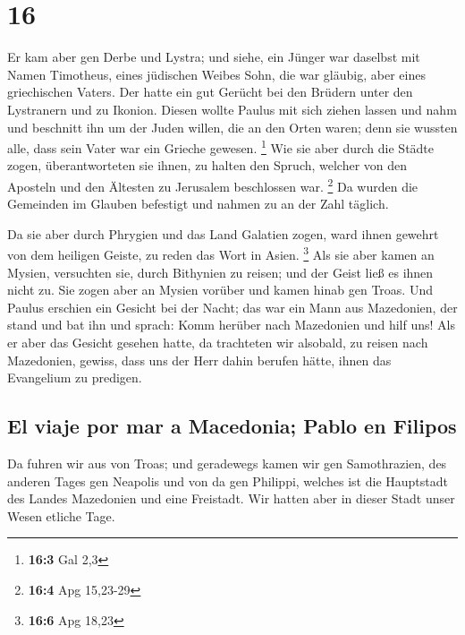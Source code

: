 \hypertarget{section-15}{%
\section{16}\label{section-15}}

 Er kam aber gen Derbe und Lystra; und siehe, ein Jünger
war daselbst mit Namen Timotheus, eines jüdischen Weibes Sohn, die war
gläubig, aber eines griechischen Vaters.  Der hatte ein
gut Gerücht bei den Brüdern unter den Lystranern und zu Ikonion.
 Diesen wollte Paulus mit sich ziehen lassen und nahm und
beschnitt ihn um der Juden willen, die an den Orten waren; denn sie
wussten alle, dass sein Vater war ein Grieche gewesen. \footnote{\textbf{16:3}
  Gal 2,3}  Wie sie aber durch die Städte zogen,
überantworteten sie ihnen, zu halten den Spruch, welcher von den
Aposteln und den Ältesten zu Jerusalem beschlossen war. \footnote{\textbf{16:4}
  Apg 15,23-29}  Da wurden die Gemeinden im Glauben
befestigt und nahmen zu an der Zahl täglich.

 Da sie aber durch Phrygien und das Land Galatien zogen,
ward ihnen gewehrt von dem heiligen Geiste, zu reden das Wort in Asien.
\footnote{\textbf{16:6} Apg 18,23}  Als sie aber kamen an
Mysien, versuchten sie, durch Bithynien zu reisen; und der Geist ließ es
ihnen nicht zu.  Sie zogen aber an Mysien vorüber und
kamen hinab gen Troas.  Und Paulus erschien ein Gesicht
bei der Nacht; das war ein Mann aus Mazedonien, der stand und bat ihn
und sprach: Komm herüber nach Mazedonien und hilf uns! 
Als er aber das Gesicht gesehen hatte, da trachteten wir alsobald, zu
reisen nach Mazedonien, gewiss, dass uns der Herr dahin berufen hätte,
ihnen das Evangelium zu predigen.

\hypertarget{el-viaje-por-mar-a-macedonia-pablo-en-filipos}{%
\subsection{El viaje por mar a Macedonia; Pablo en
Filipos}\label{el-viaje-por-mar-a-macedonia-pablo-en-filipos}}

 Da fuhren wir aus von Troas; und geradewegs kamen wir
gen Samothrazien, des anderen Tages gen Neapolis  und von
da gen Philippi, welches ist die Hauptstadt des Landes Mazedonien und
eine Freistadt. Wir hatten aber in dieser Stadt unser Wesen etliche
Tage.

